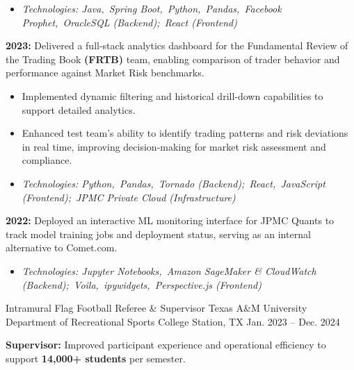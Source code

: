 \begin{cventries}
{\begin{cvitems}
{\begin{itemize}
            \item \textit{Technologies: Java,\allowbreak\ Spring Boot,\allowbreak\ Python,\allowbreak\ Pandas,\allowbreak\ Facebook Prophet,\allowbreak\ OracleSQL (Backend);\allowbreak\ React (Frontend)}
          \end{itemize}
            }
            \item { \textbf{2023:} Delivered a full-stack analytics dashboard for the Fundamental Review of the Trading Book \textbf{(FRTB)} team, enabling comparison of trader behavior and performance against Market Risk benchmarks.
            \begin{itemize}
            \item Implemented dynamic filtering and historical drill-down capabilities to support detailed analytics.
            \item Enhanced test team’s ability to identify trading patterns and risk deviations in real time, improving decision-making for market risk assessment and compliance.
            \item \textit{Technologies: Python,\allowbreak\ Pandas,\allowbreak\ Tornado (Backend);\allowbreak\ React,\allowbreak\ JavaScript (Frontend);\allowbreak\ JPMC Private Cloud (Infrastructure)} 
            \end{itemize}
            }
            \item{ \textbf{2022:} Deployed an interactive ML monitoring interface for JPMC Quants to track model training jobs and deployment status, serving as an internal alternative to Comet.com.
            \begin{itemize}
            \item \textit{Technologies: Jupyter Notebooks,\allowbreak\ Amazon SageMaker \& CloudWatch (Backend);\allowbreak\ Voila,\allowbreak\ ipywidgets,\allowbreak\ Perspective.js (Frontend)}
            \end{itemize}
            }
          \end{cvitems}
        }
        \vspace{3mm}
\cventry
  {Intramural Flag Football Referee \& Supervisor} %
  {Texas A\&M University Department of Recreational Sports} %
  {College Station, TX} %
  {Jan. 2023 -- Dec. 2024} %
  { 
    \begin{cvitems}   
      \item{
      \textbf{Supervisor:} Improved participant experience and operational efficiency to support \textbf{14,000+ students} per semester.
}
\end{cvitems}}
\end{cventries}
